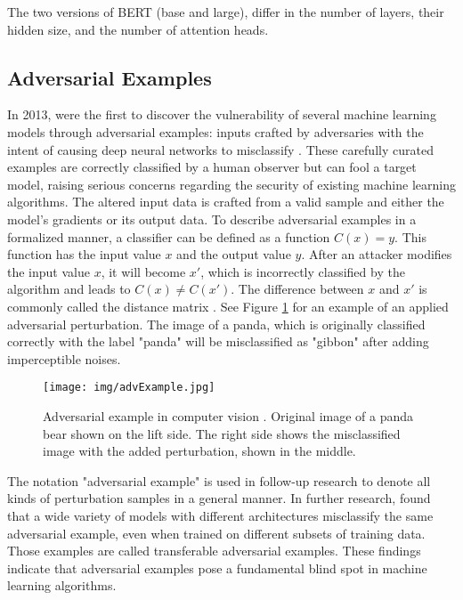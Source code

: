 The two versions of BERT (base and large), differ in the number of layers, their hidden size, and the number of attention heads.  

\subsection{Adversarial Examples}

In 2013, \cite{szegedy2013intriguing}  were the first to discover the vulnerability of several machine learning models through adversarial examples: inputs crafted by adversaries with the intent of causing deep
neural networks to misclassify \cite{papernot2016crafting}. These carefully curated examples are correctly classified by a human observer but can fool a target model, raising serious concerns regarding the security of existing machine learning algorithms. 
The altered input data is crafted from a valid sample and either the model's gradients or its output data. 
To describe adversarial examples in a formalized manner, a classifier can be defined as a function \(C(x) = y\). This function has the input value \(x\) and the output value \(y\). After an attacker modifies the input value \(x\), it will become \(x'\), which is incorrectly classified by the algorithm and leads to \(C(x) \neq C(x')\). 
The difference between \(x\) and \(x'\) is commonly called the distance matrix \cite{carlini2017towards}. 
See Figure \ref{fig:advEx} for an example of an applied adversarial perturbation. The image of a panda, which is originally classified correctly with the label "panda" will be misclassified as "gibbon" after adding imperceptible noises. 
\begin{figure}
    \centering
    \texttt{[image: img/advExample.jpg]}
    \caption{Adversarial example in computer vision \cite{papernot2016crafting}.
    Original image of a panda bear shown on the lift side. The right side shows the misclassified image with the added perturbation, shown in the middle.}
    \label{fig:advEx}
\end{figure}

The notation "adversarial example" is used in follow-up research to denote all kinds of perturbation samples in a general manner. In further research, \cite{goodfellow2014explaining} found that a wide variety of models with different architectures misclassify the same adversarial example, even when trained on different subsets of training data. Those examples are called transferable adversarial examples. These findings indicate that adversarial examples pose a fundamental blind spot in machine learning algorithms.

